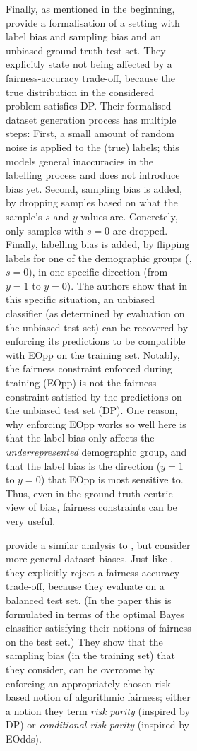 \begin{figure}[tp]
\begin{subfigure}[b]{0.4\textwidth}
\begin{subfigure}[b]{0.4\textwidth}
Finally, as mentioned in the beginning, \citet{blum2020recovering} provide a formalisation of a
setting with label bias and sampling bias and an unbiased ground-truth test set. They explicitly
state not being affected by a fairness-accuracy trade-off, because the true distribution in the
considered problem satisfies \acf{DP}. Their formalised dataset generation process has multiple
steps: First, a small amount of random noise is applied to the (true) labels; this models general
inaccuracies in the labelling process and does not introduce bias yet. Second, sampling bias is
added, by dropping samples based on what the sample's \(s\) and \(y\) values are. Concretely, only
samples with \(s=0\) are dropped. Finally, labelling bias is added, by flipping labels for one of
the demographic groups (\eg, \(s=0\)), in one specific direction (from \(y=1\) to \(y=0\)). The
authors show that in this specific situation, an unbiased classifier (as determined by evaluation
on the unbiased test set) can be recovered by enforcing its predictions to be compatible with
\acf{EOpp} on the training set. Notably, the fairness constraint enforced during training
(\ac{EOpp}) is not the fairness constraint satisfied by the predictions on the unbiased test set
(\ac{DP}). One reason, why enforcing \ac{EOpp} works so well here is that the label bias only
affects the \emph{underrepresented} demographic group, and that the label bias is the direction
(\(y=1\) to \(y=0\)) that \ac{EOpp} is most sensitive to. Thus, even in the ground-truth-centric
view of bias, fairness constraints can be very useful.

\citet{maity2020notradeoff} provide a similar analysis to \citet{blum2020recovering}, but consider
more general dataset biases. Just like \citet{blum2020recovering}, they explicitly reject a
fairness-accuracy trade-off, because they evaluate on a balanced test set. (In the paper this is
formulated in terms of the optimal Bayes classifier satisfying their notions of fairness on the
test set.) They show that the sampling bias (in the training set) that they consider, can be
overcome by enforcing an appropriately chosen risk-based notion of algorithmic fairness; either a
notion they term \emph{risk parity} (inspired by \ac{DP}) or \emph{conditional risk parity}
(inspired by \ac{EOdds}).


\end{subfigure}
\end{subfigure}
\end{figure}
